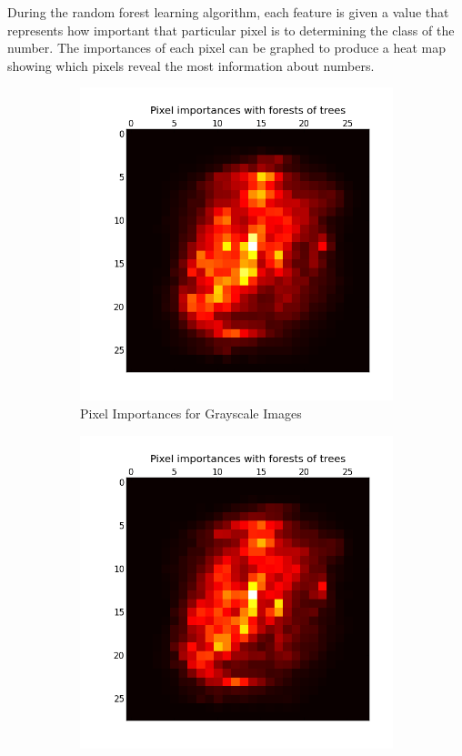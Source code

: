 \documentclass[12pt]{article}
\begin{document}
During the random forest learning algorithm, each feature is given a value that represents how important that particular pixel is to determining the class of the number. The importances of each pixel can be graphed to produce a heat map showing which pixels reveal the most information about numbers.

\begin{figure}[H]
\centering
\begin{subfigure}{.4\textwidth}
  \centering
  \includegraphics[width=1\linewidth]{gray_importances.png}
  \caption{Pixel Importances for Grayscale Images}
  \label{fig:sub1}
\end{subfigure}%
\hspace{4mm}
\begin{subfigure}{.4\textwidth}
  \centering
  \includegraphics[width=1\linewidth]{bw_importances.png}

\end{subfigure}
\end{figure}
\end{document}
